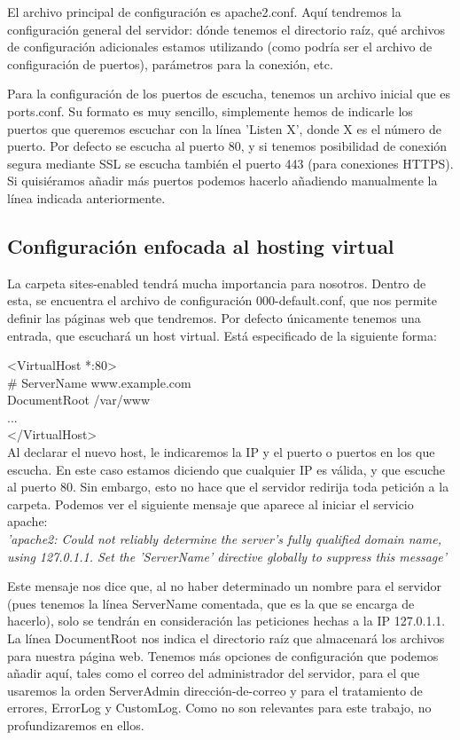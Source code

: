 \documentclass[a4paper, 10pt]{article} %
\begin{document}
El archivo principal de configuración es apache2.conf. Aquí tendremos la configuración general del servidor: dónde tenemos el directorio raíz, qué archivos de configuración adicionales estamos utilizando (como podría ser el archivo de configuración de puertos), parámetros para la conexión, etc. 

Para la configuración de los puertos de escucha, tenemos un archivo inicial que es ports.conf. Su formato es muy sencillo, simplemente hemos de indicarle los puertos que queremos escuchar con la línea 'Listen X', donde X es el número de puerto. Por defecto se escucha al puerto 80, y si tenemos posibilidad de conexión segura mediante SSL se escucha también el puerto 443 (para conexiones HTTPS). Si quisiéramos añadir más puertos podemos hacerlo añadiendo manualmente la línea indicada anteriormente. 

\subsection{Configuración enfocada al hosting virtual}

La carpeta sites-enabled tendrá mucha importancia para nosotros. Dentro de esta, se encuentra el archivo de configuración 000-default.conf, que nos permite definir las páginas web que tendremos. Por defecto únicamente tenemos una entrada, que escuchará un host virtual. Está especificado de la siguiente forma: 

<VirtualHost *:80> \\
	\# ServerName www.example.com\\
	DocumentRoot /var/www \\
	...\\
</VirtualHost>\\

Al declarar el nuevo host, le indicaremos la IP y el puerto o puertos en los que escucha. En este caso estamos diciendo que cualquier IP es válida, y que escuche al puerto 80. Sin embargo, esto no hace que el servidor redirija toda petición a la carpeta. Podemos ver el siguiente mensaje que aparece al iniciar el servicio apache: \\
\textit{'apache2: Could not reliably determine the server's fully qualified domain name, using 127.0.1.1. Set the 'ServerName' directive globally to suppress this message'}

Este mensaje nos dice que, al no haber determinado un nombre para el servidor (pues tenemos la línea ServerName comentada, que es la que se encarga de hacerlo), solo se tendrán en consideración las peticiones hechas a la IP 127.0.1.1. La línea DocumentRoot nos indica el directorio raíz que almacenará los archivos para nuestra página web. Tenemos más opciones de configuración que podemos añadir aquí, tales como el correo del administrador del servidor, para el que usaremos la orden ServerAdmin dirección-de-correo y para el tratamiento de errores, ErrorLog y CustomLog. Como no son relevantes para este trabajo, no profundizaremos en ellos. 
\end{document}
